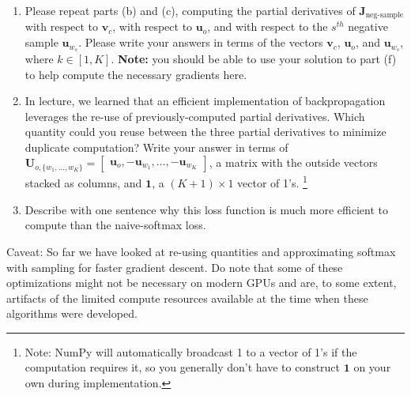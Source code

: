 \documentclass{article}
\begin{document}
\begin{enumerate}
        \begin{enumerate}
            [label=(\roman*)]
            \item Please repeat parts (b) and (c), computing the partial derivatives of $\bm J_{\text{neg-sample}}$ with respect to $\bm v_c$, with respect to $\bm u_o$, and with respect to the $s^{th}$ negative sample $\bm u_{w_s}$. Please write your answers in terms of the vectors $\bm v_c$, $\bm u_o$, and $\bm u_{w_s}$, where $k \in [1, K]$. \textbf{Note:} you should be able to use your solution to part (f) to help compute the necessary gradients here.

            \item In lecture, we learned that an efficient implementation of backpropagation leverages the re-use of previously-computed partial derivatives. Which quantity could you reuse between the three partial derivatives to minimize duplicate computation? Write your answer in terms of \\ $\bm{U}_{o, \{w_1, \dots, w_K\}} = \begin{bmatrix}
                                                                                                                                                                                                                                                                                                                                              \bm{u}_o, -\bm{u}_{w_1}, \dots, -\bm{u}_{w_K}
            \end{bmatrix}$, a matrix with the outside vectors stacked as columns, and $\bm{1}$, a $(K + 1) \times 1$ vector of 1's. \footnote{Note: NumPy will automatically broadcast 1 to a vector of 1's if the computation requires it, so you generally don't have to construct $\bm{1}$ on your own during implementation.}

            \item Describe with one sentence why this loss function is much more efficient to compute than the naive-softmax loss.
        \end{enumerate}

        Caveat: So far we have looked at re-using quantities and approximating softmax with sampling for faster gradient descent. Do note that some of these optimizations might not be necessary on modern GPUs and are, to some extent, artifacts of the limited compute resources available at the time when these algorithms were developed.


\end{enumerate}
\end{document}
